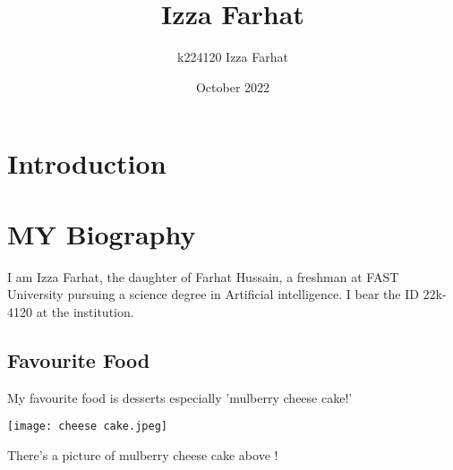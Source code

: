 \documentclass{article}
\title{Izza Farhat}
\author{k224120 Izza Farhat}
\date{October 2022}
\begin{document}
\maketitle

\section{Introduction}
\section{MY Biography}
I am Izza Farhat, the daughter of Farhat Hussain, a freshman at FAST University pursuing a science degree in Artificial intelligence. I bear the ID 22k-4120 at the institution.

\subsection{Favourite Food}
My favourite food is desserts especially 'mulberry cheese cake!'

\texttt{[image: cheese cake.jpeg]}

There's a picture of mulberry cheese cake above !
\end{document}
